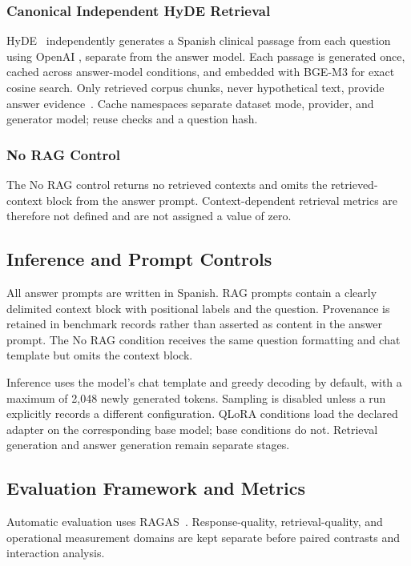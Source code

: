 \subsubsection{Canonical Independent HyDE Retrieval}
HyDE~\cite{gao2023precise} independently generates a Spanish clinical passage
from each question using OpenAI , separate from
the answer model. Each passage is generated once, cached across answer-model
conditions, and embedded with BGE-M3 for exact cosine search. Only retrieved
corpus chunks, never hypothetical text, provide answer
evidence~\cite{ji2023survey}. Cache namespaces separate dataset mode,
provider, and generator model; reuse checks  and a question hash.

\subsubsection{No RAG Control}
The No RAG control returns no retrieved contexts and
omits the retrieved-context block from the answer prompt. Context-dependent
retrieval metrics are therefore not defined and are not assigned a value of
zero.

\subsection{Inference and Prompt Controls}
All answer prompts are written in Spanish. RAG prompts contain a clearly
delimited context block with positional labels and the question. Provenance
is retained in benchmark records rather than asserted as content in the
answer prompt. The No RAG condition receives the same question
formatting and chat template but omits the context block.

Inference uses the model's chat template and greedy decoding by default,
with a maximum of 2,048 newly generated tokens. Sampling is disabled unless a
run explicitly records a different configuration. QLoRA conditions load the
declared adapter on the corresponding base model; base conditions do not.
Retrieval generation and answer generation remain separate stages.

\subsection{Evaluation Framework and Metrics}
Automatic evaluation uses RAGAS~\cite{es2024ragas}.
Response-quality, retrieval-quality, and operational measurement domains
are kept separate before paired contrasts and interaction analysis.

